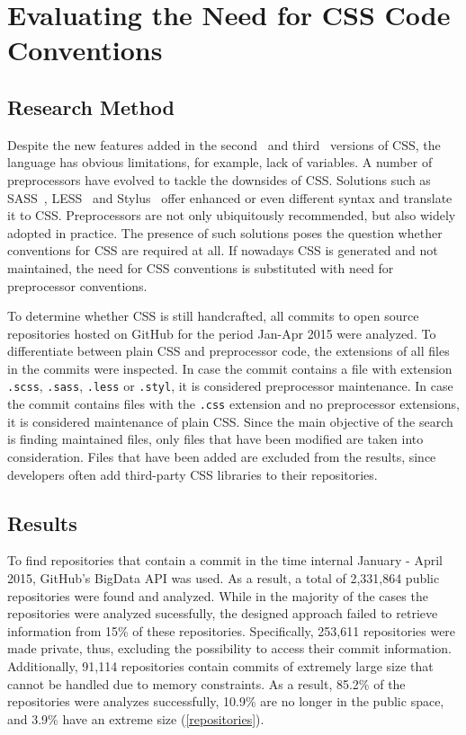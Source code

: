 \chapter{Evaluating the Need for CSS Code Conventions}
\label{sec:evaluating}

\section{Research Method}

Despite the new features added in the second~\cite{CSS2} and third~\cite{CSS3} versions of CSS, the
language has obvious limitations, for example, lack of variables. A number of preprocessors have
evolved to tackle the downsides of CSS. Solutions such as SASS~\cite{SASS}, LESS~\cite{LESS} and
Stylus~\cite{Stylus} offer enhanced or even different syntax and translate it to CSS. Preprocessors
are not only ubiquitously recommended, but also widely adopted in practice. The presence of such
solutions poses the question whether conventions for CSS are required at all. If nowadays CSS is
generated and not maintained, the need for CSS conventions is substituted with need for preprocessor conventions.

To determine whether CSS is still handcrafted, all commits to open source repositories hosted on
GitHub for the period Jan-Apr 2015 were analyzed. To differentiate between plain CSS and
preprocessor code, the extensions of all files in the commits were inspected. In case the commit
contains a file with extension \texttt{.scss}, \texttt{.sass}, \texttt{.less} or \texttt{.styl}, it
is considered preprocessor maintenance. In case the commit contains files with the \texttt{.css}
extension and no preprocessor extensions, it is considered maintenance of plain CSS. Since the main
objective of the search is finding maintained files, only files that have been modified are taken
into consideration. Files that have been added are excluded from the results, since developers often
add third-party CSS libraries to their repositories.


\section{Results}

To find repositories that contain a commit in the time internal January -
April 2015, GitHub's BigData API was used. As a result, a total of 2,331,864
public repositories were found and analyzed. While in the majority of the
cases the repositories were analyzed sucessfully, the designed approach failed
to retrieve information from 15\% of these repositories. Specifically, 253,611
repositories were made private, thus, excluding the possibility to access
their commit information. Additionally, 91,114 repositories contain commits of
extremely large size that cannot be handled due to memory constraints. As a
result, 85.2\% of the repositories were analyzes successfully, 10.9\% are no
longer in the public space, and 3.9\% have an extreme size (\autoref{repositories}).

